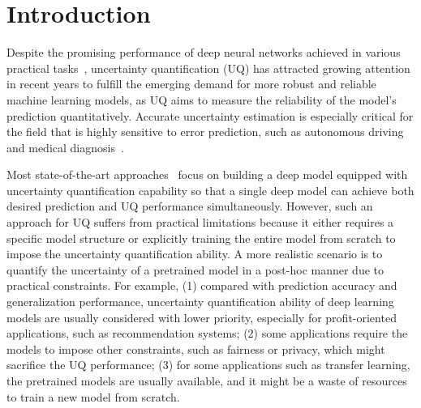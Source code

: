 
\section{Introduction}\label{sec:intro}

Despite the promising performance of deep neural networks achieved in various practical tasks~\citep{simonyan2014very, ren2015faster, hinton2012deep, mikolov2010recurrent, alipanahi2015predicting, litjens2017survey}, uncertainty quantification (UQ) has attracted growing attention in recent years to fulfill the emerging demand for more robust and reliable machine learning models, as UQ aims to measure the reliability of the model's prediction quantitatively. Accurate uncertainty estimation is especially critical for the field that is highly sensitive to error prediction, such as autonomous driving~\citep{bojarski2016end} and medical diagnosis~\citep{begoli2019need}.

Most state-of-the-art approaches~\citep{gal2016dropout, lakshminarayanan2017simple, malinin2018predictive, van2020simple} focus on building a deep model equipped with uncertainty quantification capability so that a single deep model can achieve both desired prediction and UQ performance simultaneously. However, such an approach for UQ suffers from practical limitations because it either requires a specific model structure or explicitly training the entire model from scratch to impose the uncertainty quantification ability.  A more realistic scenario is to quantify the uncertainty of a pretrained model in a post-hoc manner due to practical constraints. For example, (1) compared with prediction accuracy and generalization performance, uncertainty quantification ability of deep learning models are usually considered with lower priority, especially for profit-oriented applications, such as recommendation systems; (2) some applications require the models to impose other constraints, such as fairness or privacy, which might sacrifice the UQ performance; (3) for some applications such as transfer learning, the pretrained models are usually available, and it might be a waste of resources to train a new model from scratch.  

